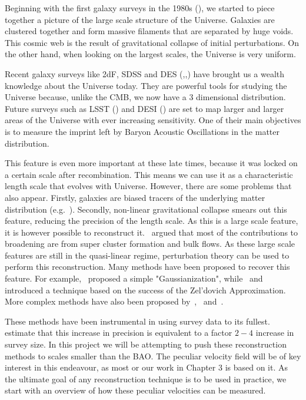 Beginning with the first galaxy surveys in the 1980s (\cite{Davis_galaxy_survey}), we started to piece together a picture of the large scale structure of the Universe. Galaxies are clustered together and form massive filaments that are separated by huge voids. This cosmic web is the result of gravitational collapse of initial perturbations. On the other hand, when looking on the largest scales, the Universe is very uniform.

Recent galaxy surveys like 2dF, SDSS and DES (\cite{2005MNRAS.362..505C},\cite{PhysRevD.69.103501},\cite{2017arXiv170801530D}) have brought us a wealth knowledge about the Universe today. They are powerful tools for studying the Universe because, unlike the CMB, we now have a 3 dimensional distribution. Future surveys such as LSST (\cite{2009arXiv0912.0201L}) and DESI (\cite{2013arXiv1308.0847L}) are set to map larger and larger areas of the Universe with ever increasing sensitivity. One of their main objectives is to measure the imprint left by Baryon Acoustic Oscillations in the matter distribution. 

This feature is even more important at these late times, because it was locked on a certain scale after recombination. This means we can use it as a characteristic length scale that evolves with Universe. However, there are some problems that also appear. Firstly, galaxies are biased tracers of the underlying matter distribution (e.g.~\cite{2016arXiv161109787D}). Secondly, non-linear gravitational collapse smears out this feature, reducing the precision of the length scale. As this is a large scale feature, it is however possible to reconstruct it.~\cite{Eisenstein_BAOpeak_reconstruction} argued that most of the contributions to broadening are from super cluster formation and bulk flows. As these large scale features are still in the quasi-linear regime, perturbation theory can be used to perform this reconstruction. Many methods have been proposed to recover this feature. For example,~\cite{1992MNRAS.254..315W} proposed a simple "Gaussianization", while~\cite{1992ApJ...391..443N} and~\cite{1993ApJ...405..449G} introduced a technique based on the success of the Zel'dovich Approximation. More complex methods have also been proposed by~\cite{1999MNRAS.308..763M},~\cite{1997MNRAS.285..793C} and~\cite{2003MNRAS.346..501B}.

These methods have been instrumental in using survey data to its fullest.~\cite{2013PhR...530...87W} estimate that this increase in precision is equivalent to a factor $2-4$ increase in survey size. In this project we will be attempting to push these reconstruction methods to scales smaller than the BAO. The peculiar velocity field will be of key interest in this endeavour, as most or our work in Chapter 3 is based on it. As the ultimate goal of any reconstruction technique is to be used in practice, we start with an overview of how these peculiar velocities can be measured. 


